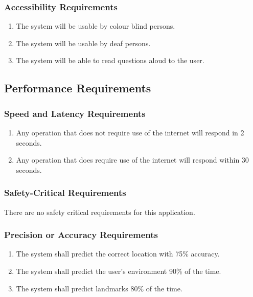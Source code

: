 \documentclass[titlepage]{article}
\begin{document}
		\subsubsection{Accessibility Requirements}
		\label{ssub:accessibility_requirements}
		\begin{enumerate}[{UH}1. ]
			\item 
			The system will be usable by colour blind persons.
			\item
			The system will be usable by deaf persons.
			\item
			The system will be able to read questions aloud to the user.
		\end{enumerate}
		
		
		\subsection{Performance Requirements}
		\label{sub:performance_requirements}
		
		
		\subsubsection{Speed and Latency Requirements}
		\label{ssub:speed_and_latency_requirements}
		\begin{enumerate}
			\item
			Any operation that does not require use of the internet will respond in 2 seconds.
			\item
			Any operation that does require use of the internet will respond within 30 seconds.
		\end{enumerate}
		
		\subsubsection{Safety-Critical Requirements}
		\label{ssub:safety_critical_requirements}
		There are no safety critical requirements for this application.
		
		\subsubsection{Precision or Accuracy Requirements}
		\label{ssub:precision_or_accuracy_requirements}
		\begin{enumerate}
			\item
			The system shall predict the correct location with 75\% accuracy.
			\item
			The system shall predict the user's environment 90\% of the time.
			\item
			The system shall predict landmarks 80\% of the time.
		\end{enumerate}
		
\end{document}
